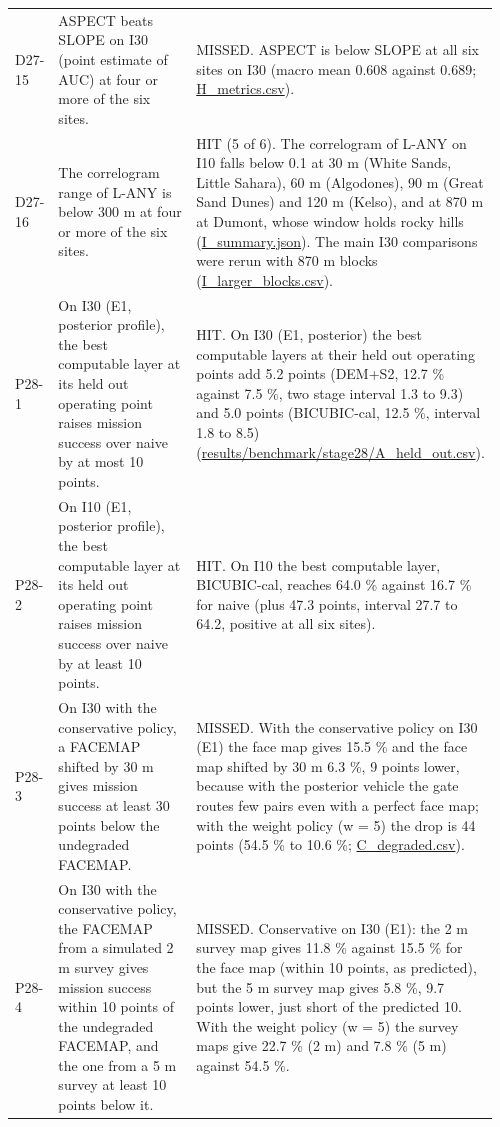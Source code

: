 \documentclass[10pt]{article}
\begin{document}
\begin{longtable}{@{}p{0.08\linewidth}p{0.42\linewidth}p{0.46\linewidth}@{}}
D27-15 & ASPECT beats SLOPE on I30 (point estimate of AUC) at four or more of the six sites. & MISSED. ASPECT is below SLOPE at all six sites on I30 (macro mean 0.608 against 0.689; \url{H_metrics.csv}). \\
D27-16 & The correlogram range of L-ANY is below 300 m at four or more of the six sites. & HIT (5 of 6). The correlogram of L-ANY on I10 falls below 0.1 at 30 m (White Sands, Little Sahara), 60 m (Algodones), 90 m (Great Sand Dunes) and 120 m (Kelso), and at 870 m at Dumont, whose window holds rocky hills (\url{I_summary.json}). The main I30 comparisons were rerun with 870 m blocks (\url{I_larger_blocks.csv}). \\
P28-1 & On I30 (E1, posterior profile), the best computable layer at its held out operating point raises mission success over naive by at most 10 points. & HIT. On I30 (E1, posterior) the best computable layers at their held out operating points add 5.2 points (DEM+S2, 12.7 \% against 7.5 \%, two stage interval 1.3 to 9.3) and 5.0 points (BICUBIC-cal, 12.5 \%, interval 1.8 to 8.5) (\url{results/benchmark/stage28/A_held_out.csv}). \\
P28-2 & On I10 (E1, posterior profile), the best computable layer at its held out operating point raises mission success over naive by at least 10 points. & HIT. On I10 the best computable layer, BICUBIC-cal, reaches 64.0 \% against 16.7 \% for naive (plus 47.3 points, interval 27.7 to 64.2, positive at all six sites). \\
P28-3 & On I30 with the conservative policy, a FACEMAP shifted by 30 m gives mission success at least 30 points below the undegraded FACEMAP. & MISSED. With the conservative policy on I30 (E1) the face map gives 15.5 \% and the face map shifted by 30 m 6.3 \%, 9 points lower, because with the posterior vehicle the gate routes few pairs even with a perfect face map; with the weight policy (w = 5) the drop is 44 points (54.5 \% to 10.6 \%; \url{C_degraded.csv}). \\
P28-4 & On I30 with the conservative policy, the FACEMAP from a simulated 2 m survey gives mission success within 10 points of the undegraded FACEMAP, and the one from a 5 m survey at least 10 points below it. & MISSED. Conservative on I30 (E1): the 2 m survey map gives 11.8 \% against 15.5 \% for the face map (within 10 points, as predicted), but the 5 m survey map gives 5.8 \%, 9.7 points lower, just short of the predicted 10. With the weight policy (w = 5) the survey maps give 22.7 \% (2 m) and 7.8 \% (5 m) against 54.5 \%. \\

\end{longtable}
\end{document}
